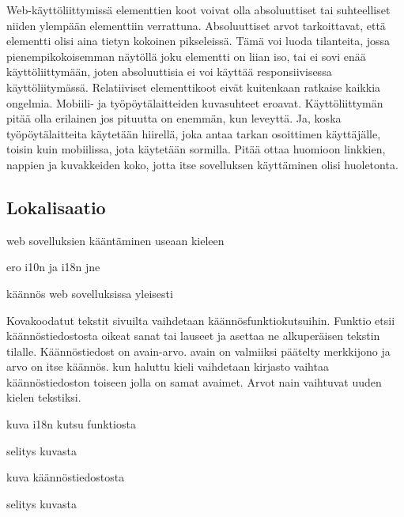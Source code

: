 \documentclass[11pt,a4paper,titlepage,oneside]{article}
\begin{document}
Web-käyttöliittymissä elementtien koot voivat olla absoluuttiset tai suhteelliset niiden ylempään elementtiin verrattuna. Absoluuttiset arvot tarkoittavat, että elementti olisi aina tietyn kokoinen pikseleissä. 
Tämä voi luoda tilanteita, jossa pienempikokoisemman näytöllä joku elementti on liian iso, tai ei sovi enää käyttöliittymään, joten absoluuttisia ei voi käyttää responsiivisessa käyttöliitymässä.
Relatiiviset elementtikoot eivät kuitenkaan ratkaise kaikkia ongelmia. Mobiili- ja työpöytälaitteiden kuvasuhteet eroavat. Käyttöliittymän pitää olla erilainen jos pituutta on enemmän, kun leveyttä. 
Ja, koska työpöytälaitteita käytetään hiirellä, joka antaa tarkan osoittimen käyttäjälle, toisin kuin mobiilissa, jota käytetään sormilla. 
Pitää ottaa huomioon linkkien, nappien ja kuvakkeiden koko, jotta itse sovelluksen käyttäminen olisi huoletonta.\medskip
\medskip






\subsection{Lokalisaatio}

web sovelluksien kääntäminen useaan kieleen

ero i10n ja i18n jne
\medskip

käännös web sovelluksissa yleisesti

Kovakoodatut tekstit sivuilta vaihdetaan käännösfunktiokutsuihin.
Funktio etsii käännöstiedostosta oikeat sanat tai lauseet ja asettaa ne alkuperäisen tekstin tilalle. 
Käännöstiedost on avain-arvo. %
avain on valmiiksi päätelty merkkijono ja arvo on itse käännös. 
kun haluttu kieli vaihdetaan kirjasto vaihtaa käännöstiedoston toiseen jolla on samat avaimet. 
Arvot nain vaihtuvat uuden kielen tekstiksi.

\medskip

kuva i18n kutsu funktiosta

selitys kuvasta

kuva käännöstiedostosta

selitys kuvasta









\newpage
\end{document}

